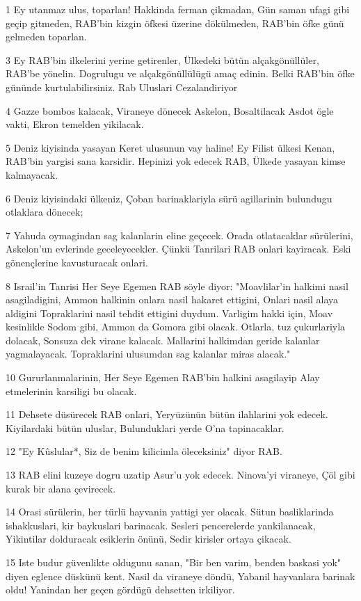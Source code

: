 \par 1 Ey utanmaz ulus, toparlan! Hakkinda ferman çikmadan, Gün saman ufagi gibi geçip gitmeden, RAB'bin kizgin öfkesi üzerine dökülmeden, RAB'bin öfke günü gelmeden toparlan.
\par 3 Ey RAB'bin ilkelerini yerine getirenler, Ülkedeki bütün alçakgönüllüler, RAB'be yönelin. Dogrulugu ve alçakgönüllülügü amaç edinin. Belki RAB'bin öfke gününde kurtulabilirsiniz. Rab Uluslari Cezalandiriyor
\par 4 Gazze bombos kalacak, Viraneye dönecek Askelon, Bosaltilacak Asdot ögle vakti, Ekron temelden yikilacak.
\par 5 Deniz kiyisinda yasayan Keret ulusunun vay haline! Ey Filist ülkesi Kenan, RAB'bin yargisi sana karsidir. Hepinizi yok edecek RAB, Ülkede yasayan kimse kalmayacak.
\par 6 Deniz kiyisindaki ülkeniz, Çoban barinaklariyla sürü agillarinin bulundugu otlaklara dönecek;
\par 7 Yahuda oymagindan sag kalanlarin eline geçecek. Orada otlatacaklar sürülerini, Askelon'un evlerinde geceleyecekler. Çünkü Tanrilari RAB onlari kayiracak. Eski gönençlerine kavusturacak onlari.
\par 8 Israil'in Tanrisi Her Seye Egemen RAB söyle diyor: "Moavlilar'in halkimi nasil asagiladigini, Ammon halkinin onlara nasil hakaret ettigini, Onlari nasil alaya aldigini Topraklarini nasil tehdit ettigini duydum. Varligim hakki için, Moav kesinlikle Sodom gibi, Ammon da Gomora gibi olacak. Otlarla, tuz çukurlariyla dolacak, Sonsuza dek virane kalacak. Mallarini halkimdan geride kalanlar yagmalayacak. Topraklarini ulusumdan sag kalanlar miras alacak."
\par 10 Gururlanmalarinin, Her Seye Egemen RAB'bin halkini asagilayip Alay etmelerinin karsiligi bu olacak.
\par 11 Dehsete düsürecek RAB onlari, Yeryüzünün bütün ilahlarini yok edecek. Kiyilardaki bütün uluslar, Bulunduklari yerde O'na tapinacaklar.
\par 12 "Ey Kûslular*, Siz de benim kilicimla öleceksiniz" diyor RAB.
\par 13 RAB elini kuzeye dogru uzatip Asur'u yok edecek. Ninova'yi viraneye, Çöl gibi kurak bir alana çevirecek.
\par 14 Orasi sürülerin, her türlü hayvanin yattigi yer olacak. Sütun basliklarinda ishakkuslari, kir baykuslari barinacak. Sesleri pencerelerde yankilanacak, Yikintilar dolduracak esiklerin önünü, Sedir kirisler ortaya çikacak.
\par 15 Iste budur güvenlikte oldugunu sanan, "Bir ben varim, benden baskasi yok" diyen eglence düskünü kent. Nasil da viraneye döndü, Yabanil hayvanlara barinak oldu! Yanindan her geçen gördügü dehsetten irkiliyor.

